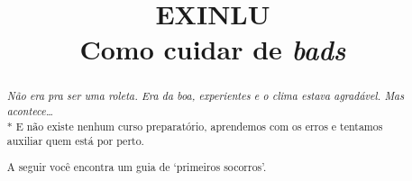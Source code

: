 %
%
%
%
%
% 
%
%
%
%
%
%
%
%
%

%
%

%
%
\pagestyle{empty}
%
\title{EXINLU \\ Como cuidar de \textit{bads}} %
\author{}
\date{}
\maketitle
\renewcommand{\abstractname}{}
\begin{abstract}
\emph{Não era pra ser uma roleta. Era da boa, experientes e o clima estava 
agradável. Mas acontece\ldots}\\*
E não existe nenhum curso preparatório, aprendemos com os erros e 
tentamos auxiliar quem está por perto.\\
\par
A seguir você encontra um guia de `primeiros socorros'.
\end{abstract}
\newpage %
%
%
